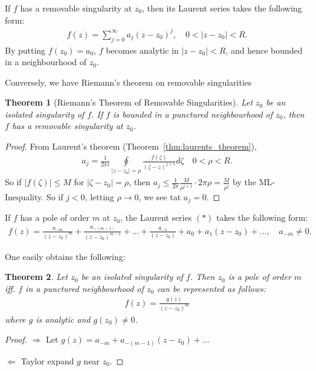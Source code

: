 \documentclass[12pt, a4paper]{article}
\theoremstyle{plain}
\newtheorem{thm}{Theorem} %
\theoremstyle{definition}
\begin{document}
		If $f$ has a removable singularity at $z_0$, then its Laurent series takes the following form:
		\begin{align*}
			f(z)=\sum\limits_{j=0}^{\infty}a_j(z-z_0)^j,\quad 0<|z-z_0|<R.
		\end{align*}
		By putting $f(z_0)=a_0$, $f$ becomes analytic in $|z-z_0|<R$, and hence bounded in a neighbourhood of $z_0$.

		Conversely, we have Riemann's theorem on removable singularities\\

		\begin{thm}[Riemann's Theorem of Removable Singularities]
			Let $z_0$ be an isolated singularity of $f$. If $f$ is bounded in a punctured neighbourhood of $z_0$, then $f$ has a removable singularity at $z_0$.
		\end{thm}

		\begin{proof}
			From Laurent's theorem (Theorem~\ref{thm:laurents_theorem}),
			\begin{align*}
				a_j = \frac{1}{2\pi i}\oint\limits_{|z-z_0|=\rho}\frac{f(\zeta)}{(\zeta-z)^{j+1}}d \zeta \quad 0< \rho < R.
			\end{align*}
			So if $|f(\zeta)|\le M$ for $|\zeta-z_0|=\rho$, then $a_j\le \frac{1}{2\pi}\frac{M}{\rho^{j+1}}\cdot 2\pi \rho = \frac{M}{\rho^j}$ by the ML-Inequality. So if $j<0$, letting $\rho\to 0$, we see tat $a_j=0$.
		\end{proof}

		If $f$ has a pole of order $m$ at $z_0$, the Laurent series $(*)$ takes the following form:
		\begin{align*}
			f(z) = \frac{a_{-m}}{(z-z_0)^m}+ \frac{a_{-(m-1)}}{(z-z_0)^{m-1}} + \ldots + \frac{a_{-1}}{(z-z_0)} + a_0 + a_1(z-z_0) + \ldots,\quad a_{-m}\not =0.
		\end{align*}

		One easily obtains the following:\\

		\begin{thm}
			Let $z_0$ be an isolated singularity of $f$. Then $z_0$ is a pole of order $m$ iff. $f$ in a punctured neighbourhood of $z_0$ can be represented as follows:
			\begin{align*}
				f(z) = \frac{g(z)}{(z-z_0)^m}
			\end{align*}
			where $g$ is analytic and $g(z_0)\not=0$.
		\end{thm}

		\begin{proof}
			$\Rightarrow$ Let $g(z) =  a_{-m}+a_{-(m-1)}(z-z_0)+\ldots$

			$\Leftarrow$ Taylor expand $g$ near $z_0$.
		\end{proof}
\end{document}
